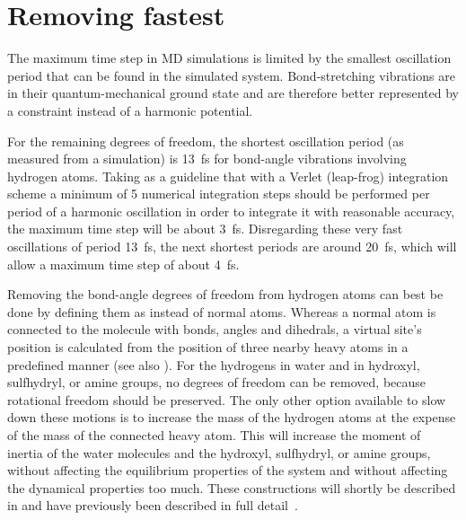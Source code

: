 \newcommand{\amine}{\sf -NH$_2$}
\newcommand{\amines}{\sf -NH-}
\newcommand{\aminep}{\sf -NH$_3^+$}
\section{Removing fastest }
\label{sec:rmfast}
The maximum time step in MD simulations is limited by the smallest
oscillation period that can be found in the simulated
system. Bond-stretching vibrations are in their quantum-mechanical
ground state and are therefore better represented by a constraint 
instead of a harmonic potential.

For the remaining degrees of freedom, the shortest oscillation period
(as measured from a simulation) is 13~fs for bond-angle vibrations
involving hydrogen atoms. Taking as a guideline that with a Verlet
(leap-frog) integration scheme a minimum of 5 numerical integration
steps should be performed per period of a harmonic oscillation in
order to integrate it with reasonable accuracy, the maximum time step
will be about 3~fs. Disregarding these very fast oscillations of
period 13~fs, the next shortest periods are around 20~fs, which will
allow a maximum time step of about 4~fs.

Removing the bond-angle degrees of freedom from hydrogen atoms can
best be done by defining them as 
instead of normal atoms. Whereas a normal atom is connected to the molecule
with bonds, angles and dihedrals, a virtual site's position is calculated
from the position of three nearby heavy atoms in a predefined manner
(see also ). For the hydrogens in water and in
hydroxyl, sulfhydryl, or amine groups, no degrees of freedom can be
removed, because rotational freedom should be preserved. The only
other option available to slow down these motions is to increase the
mass of the hydrogen atoms at the expense of the mass of the connected
heavy atom. This will increase the moment of inertia of the water
molecules and the hydroxyl, sulfhydryl, or amine groups, without
affecting the equilibrium properties of the system and without
affecting the dynamical properties too much. These constructions will
shortly be described in  and have previously
been described in full detail~\cite{feenstra99}.

